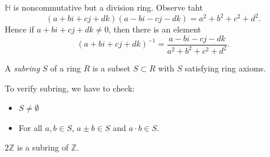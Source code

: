 \begin{enumerate}
\begin{example}
		$\mathbb{H}$ is noncommutative but a division ring. Observe taht \[
			(a+bi+cj+dk)(a-bi-cj-dk) = a^2 + b^2+c^2+d^2
		.\] 
		Hence if $a+bi+cj+dk \neq 0$, then there is an element \[
			(a+bi+cj+dk)^{-1} = \frac{a-bi-cj-dk}{a^2 + b^2+c^2+d^2}
		.\] 
	\end{example}
\end{enumerate}

\begin{definition}[Subring]
	A \textit{subring} $S$ of a ring $R$ is a subset $S \subset R$ with $S$ satisfying ring axioms.
\end{definition}
To verify subring, we have to check:
\begin{itemize}
	\item $S \neq \emptyset $ 
	\item For all $a,b \in S$, $a \pm b \in S$ and $a \cdot b \in S$.
\end{itemize}
\begin{example}
	$2\mathbb{Z}$ is a subring of $\mathbb{Z}$.
\end{example}
